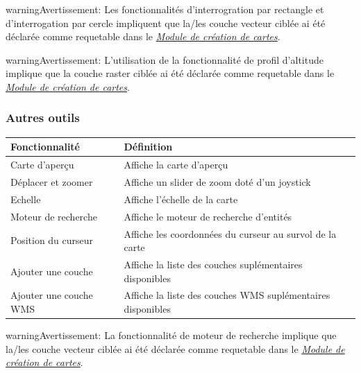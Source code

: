 \documentclass[letterpaper,10pt,french]{sphinxmanual}
\begin{document}
\begin{notice}{warning}{Avertissement:}
Les fonctionnalités d'interrogration par rectangle et d'interrogation par cercle impliquent que la/les couche vecteur ciblée ai été déclarée comme requetable dans le {\hyperref[maps/index::doc]{\emph{\emph{Module de création de cartes}}}}.
\end{notice}

\begin{notice}{warning}{Avertissement:}
L'utilisation de la fonctionnalité de profil d'altitude implique que la couche raster ciblée ai été déclarée comme requetable dans le {\hyperref[maps/index::doc]{\emph{\emph{Module de création de cartes}}}}.
\end{notice}


\subsubsection{Autres outils}
\label{apps/appconfig:autres-outils}
\begin{tabulary}{\linewidth}{|L|L|}
\hline

\textbf{Fonctionnalité}
 & 
\textbf{Définition}
\\
\hline
Carte d'aperçu
 & 
Affiche la carte d'aperçu
\\
\hline
Déplacer et zoomer
 & 
Affiche un slider de zoom doté d'un joystick
\\
\hline
Echelle
 & 
Affiche l'échelle de la carte
\\
\hline
Moteur de recherche
 & 
Affiche le moteur de recherche d'entités
\\
\hline
Position du curseur
 & 
Affiche les coordonnées du curseur au survol de la carte
\\
\hline
Ajouter une couche
 & 
Affiche la liste des couches suplémentaires disponibles
\\
\hline
Ajouter une couche WMS
 & 
Affiche la liste des couches WMS suplémentaires disponibles
\\
\hline\end{tabulary}


\begin{notice}{warning}{Avertissement:}
La fonctionnalité de moteur de recherche implique que la/les couche vecteur ciblée ai été déclarée comme requetable dans le {\hyperref[maps/index::doc]{\emph{\emph{Module de création de cartes}}}}.
\end{notice}
\end{document}

